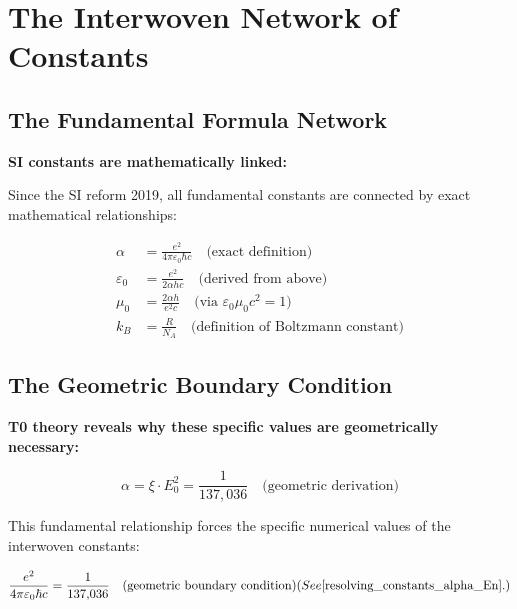 	\section{The Interwoven Network of Constants}
	
	\subsection{The Fundamental Formula Network}
	
	\begin{derivation}
		\textbf{SI constants are mathematically linked:}
		
		Since the SI reform 2019, all fundamental constants are connected by exact mathematical relationships:
		
		\begin{align}
			\alpha &= \frac{e^2}{4\pi\varepsilon_0\hbar c} \quad \text{(exact definition)} \\
			\varepsilon_0 &= \frac{e^2}{2\alpha h c} \quad \text{(derived from above)} \\
			\mu_0 &= \frac{2\alpha h}{e^2 c} \quad \text{(via } \varepsilon_0\mu_0c^2 = 1) \\
			k_B &= \frac{R}{N_A} \quad \text{(definition of Boltzmann constant)}
		\end{align}
	\end{derivation}
	
	\subsection{The Geometric Boundary Condition}
	
	\begin{insight}
		\textbf{T0 theory reveals why these specific values are geometrically necessary:}
		
		\begin{equation}
			\alpha = \xi \cdot E_0^2 = \frac{1}{137{,}036} \quad \text{(geometric derivation)}
		\end{equation}
		
		This fundamental relationship forces the specific numerical values of the interwoven constants:
		
		\begin{equation}
			\frac{e^2}{4\pi\varepsilon_0\hbar c} = \frac{1}{137{,}036} \quad \text{(geometric boundary condition)} (See \cite{resolving_constants_alpha_En}.)
		\end{equation}
	\end{insight}
	

